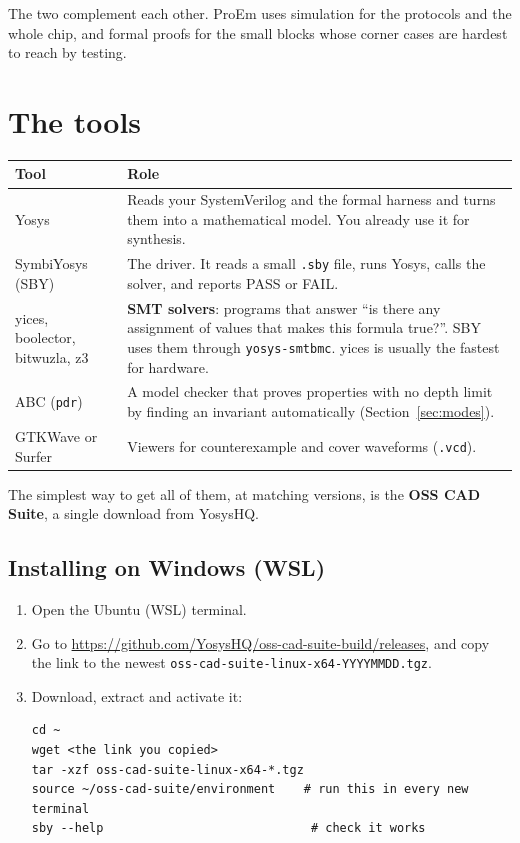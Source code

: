 \documentclass[11pt,a4paper]{article}
\newcommand{\file}[1]{\texttt{#1}}
\begin{document}
The two complement each other. ProEm uses simulation for the protocols and the whole chip, and formal proofs for the small blocks whose corner cases are hardest to reach by testing.

\section{The tools}

\begin{center}
\begin{tabularx}{\linewidth}{@{}lX@{}}
\toprule
Tool & Role \\
\midrule
Yosys & Reads your SystemVerilog and the formal harness and turns them into a mathematical model. You already use it for synthesis. \\
SymbiYosys (SBY) & The driver. It reads a small \file{.sby} file, runs Yosys, calls the solver, and reports PASS or FAIL. \\
yices, boolector, bitwuzla, z3 & \textbf{SMT solvers}: programs that answer ``is there any assignment of values that makes this formula true?''. SBY uses them through \file{yosys-smtbmc}. yices is usually the fastest for hardware. \\
ABC (\texttt{pdr}) & A model checker that proves properties with no depth limit by finding an invariant automatically (Section~\ref{sec:modes}). \\
GTKWave or Surfer & Viewers for counterexample and cover waveforms (\file{.vcd}). \\
\bottomrule
\end{tabularx}
\end{center}

The simplest way to get all of them, at matching versions, is the \textbf{OSS CAD Suite}, a single download from YosysHQ.

\subsection{Installing on Windows (WSL)}

\begin{enumerate}
\item Open the Ubuntu (WSL) terminal.
\item Go to \url{https://github.com/YosysHQ/oss-cad-suite-build/releases}, and copy the link to the newest \file{oss-cad-suite-linux-x64-YYYYMMDD.tgz}.
\item Download, extract and activate it:
\begin{lstlisting}
cd ~
wget <the link you copied>
tar -xzf oss-cad-suite-linux-x64-*.tgz
source ~/oss-cad-suite/environment    # run this in every new terminal
sby --help                             # check it works
\end{lstlisting}
\end{enumerate}
\end{document}
